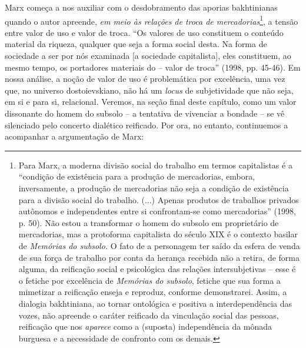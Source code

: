 Marx começa a nos auxiliar com o desdobramento das aporias bakhtinianas
quando o autor apreende, \emph{em meio às relações de troca de
mercadorias}\footnote{Para Marx, a moderna divisão social do trabalho em
  termos capitalistas é a ``condição de existência para a produção de
  mercadorias, embora, inversamente, a produção de mercadorias não seja
  a condição de existência para a divisão social do trabalho. (...)
  Apenas produtos de trabalhos privados autônomos e independentes entre
  si confrontam-se como mercadorias'' (1998, p. 50). Não estou a
  transformar o homem do subsolo em proprietário de mercadorias, mas a
  protoforma capitalista do século XIX é o contexto basilar de
  \emph{Memórias do subsolo.} O fato de a personagem ter saído da esfera
  de venda de sua força de trabalho por conta da herança recebida não a
  retira, de forma alguma, da reificação social e psicológica das
  relações intersubjetivas -- esse é o fetiche por excelência de
  \emph{Memórias do subsolo}, fetiche que sua forma a mimetizar a
  reificação enseja e reproduz, conforme demonstrarei. Assim, a dialogia
  bakhtiniana, ao tornar ontológica e positiva a interdependência das
  vozes, não apreende o caráter reificado da vinculação social das
  pessoas, reificação que nos \emph{aparece} como a (suposta)
  independência da mônada burguesa e a necessidade de confronto com os
  demais.}, a tensão entre valor de uso e valor de troca. ``Os valores
de uso constituem o conteúdo material da riqueza, qualquer que seja a
forma social desta. Na forma de sociedade a ser por nós examinada {[}a
sociedade capitalista{]}, eles constituem, ao mesmo tempo, os portadores
materiais do -- valor de troca'' (1998, pp. 45-46). Em nossa análise, a
noção de valor de uso é problemática por excelência, uma vez que, no
universo dostoievskiano, não há um \emph{locus} de subjetividade que não
seja, em si e para si, relacional. Veremos, na seção final deste
capítulo, como um valor dissonante do homem do subsolo -- a tentativa de
vivenciar a bondade -- se vê silenciado pelo concerto dialético
reificado. Por ora, no entanto, continuemos a acompanhar a argumentação
de Marx:

